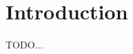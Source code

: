 \documentclass[
  digital, %
  table,   %
  lof,     %
  lot,     %
  oneside,
]{fithesis3}
\begin{document}
\chapter{Introduction}
TODO...
%
%
%
%
%
\end{document}

